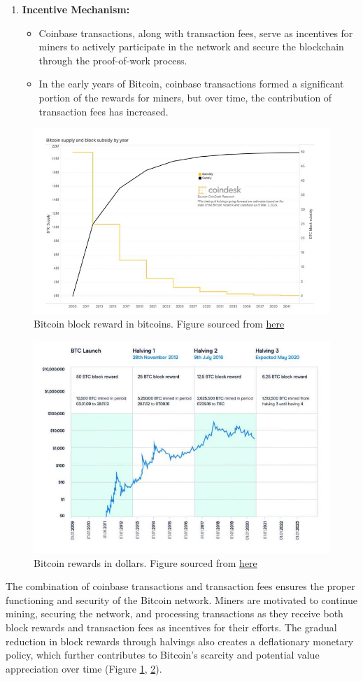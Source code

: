 \begin{enumerate}
\begin{itemize}
	\end{itemize}
	\item \textbf{Incentive Mechanism:}
	\begin{itemize}
		\item Coinbase transactions, along with transaction fees, serve as incentives for miners to actively participate in the network and secure the blockchain through the proof-of-work process.
		\item In the early years of Bitcoin, coinbase transactions formed a significant portion of the rewards for miners, but over time, the contribution of transaction fees has increased.
	\end{itemize}
\end{enumerate}
\begin{figure}[h!]
	\centering
	\includegraphics[width=0.6\linewidth]{Fig/05/F1}
	\caption{Bitcoin block reward in bitcoins. Figure sourced from  \href{https://www.coindesk.com/bitcoin-halving-explainer}{here}}
	\label{fig:L5_f1}
\end{figure}

\begin{figure}[h!]
	\centering
	\includegraphics[width=0.6\linewidth]{Fig/05/F2}
	\caption{Bitcoin rewards in dollars. Figure sourced from  \href{https://www.cmcmarkets.com/en/learn-cryptocurrencies/bitcoin-halving}{here}}
	\label{fig:L5_f2}
\end{figure}
The combination of coinbase transactions and transaction fees ensures the proper functioning and security of the Bitcoin network. Miners are motivated to continue mining, securing the network, and processing transactions as they receive both block rewards and transaction fees as incentives for their efforts. The gradual reduction in block rewards through halvings also creates a deflationary monetary policy, which further contributes to Bitcoin's scarcity and potential value appreciation over time (Figure \ref{fig:L5_f1}, \ref{fig:L5_f2}).

